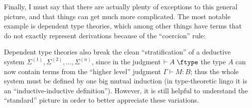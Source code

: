 \documentclass{book}
\def\sig{\Sigma}
\let\types\vdash
\def\type{\;\ftype}
\begin{document}
Finally, I must say that there are actually plenty of exceptions to this general picture, and that things can get much more complicated.
The most notable example is dependent type theories, which among other things have terms that do not exactly represent derivations because of the ``coercion'' rule:
\begin{mathpar}
\end{mathpar}
Dependent type theories also break the clean ``stratification'' of a deductive system $\sig^{(1)},\sig^{(2)},\dots,\sig^{(n)}$, since in the judgment $\types A\type$ the type $A$ can now contain terms from the ``higher level'' judgment $\Gamma\types M:B$; thus the whole system must be defined by one big mutual induction (in type-theoretic lingo it is an ``inductive-inductive definition'').
However, it is still helpful to understand the ``standard'' picture in order to better appreciate these variations.





\end{document}
